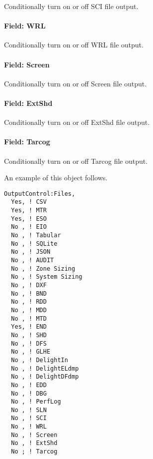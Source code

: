 Conditionally turn on or off SCI file output.

\paragraph{Field: WRL}\label{field-wrl}

Conditionally turn on or off WRL file output.

\paragraph{Field: Screen}\label{field-screen}

Conditionally turn on or off Screen file output.

\paragraph{Field: ExtShd}\label{field-ext-shd}

Conditionally turn on or off ExtShd file output.

\paragraph{Field: Tarcog}\label{field-tarcog}

Conditionally turn on or off Tarcog file output.

An example of this object follows.

\begin{lstlisting}
OutputControl:Files,
  Yes, ! CSV
  Yes, ! MTR
  Yes, ! ESO
  No , ! EIO
  No , ! Tabular
  No , ! SQLite
  No , ! JSON
  No , ! AUDIT
  No , ! Zone Sizing
  No , ! System Sizing
  No , ! DXF
  No , ! BND
  No , ! RDD
  No , ! MDD
  No , ! MTD
  Yes, ! END
  No , ! SHD
  No , ! DFS
  No , ! GLHE
  No , ! DelightIn
  No , ! DelightELdmp
  No , ! DelightDFdmp
  No , ! EDD
  No , ! DBG
  No , ! PerfLog
  No , ! SLN
  No , ! SCI
  No , ! WRL
  No , ! Screen
  No , ! ExtShd
  No ; ! Tarcog
\end{lstlisting}
